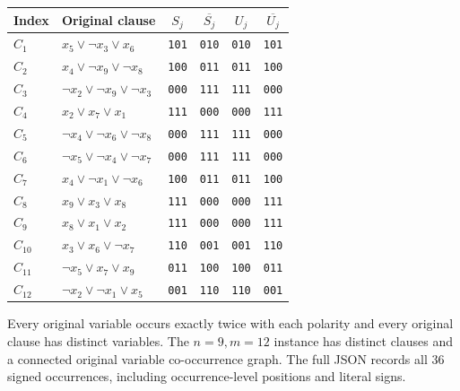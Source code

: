 \documentclass[11pt]{article}
\begin{document}
\begin{center}\small\begin{longtable}{@{}llcccc@{}}\toprule
Index & Original clause & $S_j$ & $\overline{S_j}$ & $U_j$ & $\overline{U_j}$\\\midrule\endhead
\(C_{1}\) & \( x_{5}\lor \neg x_{3}\lor x_{6} \) & \texttt{101} & \texttt{010} & \texttt{010} & \texttt{101} \\
\(C_{2}\) & \( x_{4}\lor \neg x_{9}\lor \neg x_{8} \) & \texttt{100} & \texttt{011} & \texttt{011} & \texttt{100} \\
\(C_{3}\) & \( \neg x_{2}\lor \neg x_{9}\lor \neg x_{3} \) & \texttt{000} & \texttt{111} & \texttt{111} & \texttt{000} \\
\(C_{4}\) & \( x_{2}\lor x_{7}\lor x_{1} \) & \texttt{111} & \texttt{000} & \texttt{000} & \texttt{111} \\
\(C_{5}\) & \( \neg x_{4}\lor \neg x_{6}\lor \neg x_{8} \) & \texttt{000} & \texttt{111} & \texttt{111} & \texttt{000} \\
\(C_{6}\) & \( \neg x_{5}\lor \neg x_{4}\lor \neg x_{7} \) & \texttt{000} & \texttt{111} & \texttt{111} & \texttt{000} \\
\(C_{7}\) & \( x_{4}\lor \neg x_{1}\lor \neg x_{6} \) & \texttt{100} & \texttt{011} & \texttt{011} & \texttt{100} \\
\(C_{8}\) & \( x_{9}\lor x_{3}\lor x_{8} \) & \texttt{111} & \texttt{000} & \texttt{000} & \texttt{111} \\
\(C_{9}\) & \( x_{8}\lor x_{1}\lor x_{2} \) & \texttt{111} & \texttt{000} & \texttt{000} & \texttt{111} \\
\(C_{10}\) & \( x_{3}\lor x_{6}\lor \neg x_{7} \) & \texttt{110} & \texttt{001} & \texttt{001} & \texttt{110} \\
\(C_{11}\) & \( \neg x_{5}\lor x_{7}\lor x_{9} \) & \texttt{011} & \texttt{100} & \texttt{100} & \texttt{011} \\
\(C_{12}\) & \( \neg x_{2}\lor \neg x_{1}\lor x_{5} \) & \texttt{001} & \texttt{110} & \texttt{110} & \texttt{001} \\
\bottomrule\end{longtable}\end{center}

Every original variable occurs exactly twice with each polarity and every original clause has distinct variables. The $n=9,m=12$ instance has distinct clauses and a connected original variable co-occurrence graph. The full JSON records all 36 signed occurrences, including occurrence-level positions and literal signs.
\end{document}
